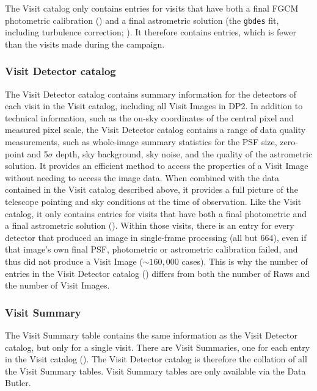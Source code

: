 The Visit catalog only contains entries for visits that have both a final \gls{FGCM} photometric calibration () and a final astrometric solution (the \texttt{gbdes} fit, including turbulence correction; ).
It therefore contains \nvisitrows entries, which is fewer than the \nvisits visits made during the campaign.

\subsubsection{Visit Detector catalog}
\label{sssec:visitdetector}
The Visit Detector catalog contains summary information for the detectors of each visit in the Visit catalog, including all Visit Images in DP2.
In addition to technical information, such as the on-sky coordinates of the central pixel and measured pixel scale, the Visit Detector catalog contains a range of data quality measurements, such as whole-image summary statistics for the \gls{PSF} size, zero-point and 5$\sigma$ depth, sky background, sky noise, and the quality of the astrometric solution.
It provides an efficient method to access the properties of a Visit Image without needing to access the image data.
When combined with the data contained in the Visit catalog described above, it provides a full picture of the telescope pointing and sky conditions at the time of observation.
Like the Visit catalog, it only contains entries for visits that have both a final photometric and a final astrometric solution ().
Within those visits, there is an entry for every detector that produced an image in single-frame processing (all but 664), even if that image's own final PSF, photometric or astrometric calibration failed, and thus did not produce a Visit Image ($\sim160{,}000$ cases).
This is why the number of entries in the Visit Detector catalog (\nvisitdetectorrows) differs from both the number of Raws and the number of Visit Images.

\subsubsection{Visit Summary}
\label{sssec:visitsummary}
The Visit Summary table contains the same information as the Visit Detector catalog, but only for a single visit.
There are \nvisitsummaries Visit Summaries, one for each entry in the Visit catalog ().
The Visit Detector catalog is therefore the collation of all the Visit Summary tables.
Visit Summary tables are only available via the Data Butler.
